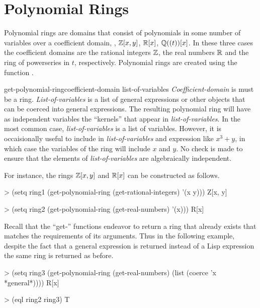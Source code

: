 \chapter{Polynomial Rings}
\label{Polynomial:Chap}

Polynomial rings are domains that consist of polynomials in some
number of variables over a coefficient domain, \eg, ${\Bbb Z}[x, y]$,
${\Bbb R}[x]$, ${\Bbb Q}((t))[x]$.  In these three cases the coefficient domains
are the rational integers ${\Bbb Z}$, the real numbers ${\Bbb R}$ and the ring of powerseries
in $t$, respectively.  Polynomial rings are created using the function
.

\begin{genericdef}{get-polynomial-ring}{coefficient-domain list-of-variables}
{\em Coefficient-domain} is must be a ring.  {\em List-of-variables}
is a list of general expressions or other objects that can be coerced
into general 
expressions.   The resulting polynomial ring will have as independent
variables the ``kernels'' that appear in {\em list-of-variables}.  In the
most common case, {\em list-of-variables} is a list of variables.
However, it is occaisionally useful to include in {\em
list-of-variables} and expression like $x^3+y$, in which case the
variables of the ring will include $x$ and $y$.  No
check is made to ensure that the elements of {\em list-of-variables}
are algebraically independent.
\end{genericdef}

For instance, the rings ${\Bbb Z}[x,y]$ and ${\Bbb R}[x]$ can be constructed as
follows.
\begin{code}
> (setq ring1 (get-polynomial-ring (get-rational-integers) '(x y)))
Z[x, y]

> (setq ring2 (get-polynomial-ring (get-real-numbers) '(x)))
R[x]
\end{code}
Recall that the ``{\sf get-}'' functions endeavor to return a ring
that already exists that matches the requirements of its
arguments.  Thus in the following example, despite the fact that a general
expression is returned instead of a Lisp expression the same ring is
returned as before.
\begin{code}
> (setq ring3 (get-polynomial-ring (get-real-numbers) 
                                   (list (coerce 'x *general*))))
R[x]


> (eql ring2 ring3)
T
\end{code}

